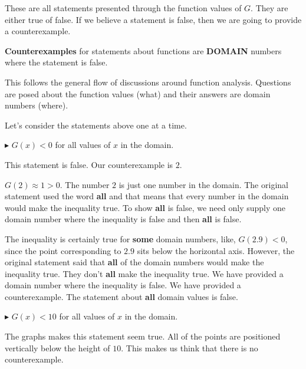 \documentclass{ximera}
\begin{document}
These are all statements presented through the function values of $G$.  They are either true of false.  If we believe a statement is false, then we are going to provide a counterexample. 

\textbf{\textcolor{red!70!black}{Counterexamples}} for statements about functions are \textbf{\textcolor{red!70!black}{DOMAIN}} numbers where the statement is false. 


This follows the general flow of discussions around function analysis.  Questions are posed about the function values (what) and their answers are domain numbers (where). 


Let's consider the statements above one at a time. 












\textbf{\textcolor{red!70!darkgray}{$\blacktriangleright$}} $G(x) < 0$  for all values of $x$ in the domain. 


This statement is false. Our counterexample is $2$.  

$G(2) \approx 1 > 0$. The number $2$ is just one number in the domain.   The original statement used the word \textbf{all} and that means that every number in the domain would make the inequality true.  To show \textbf{all} is false, we need only supply one domain number where the inequality is false and then \textbf{all} is false.

The inequality is certainly true for \textbf{some} domain numbers, like, $G(2.9) < 0$, since the point corresponding to $2.9$ sits below the horizontal axis.  However, the original statement said that \textbf{all} of the domain numbers would make the inequality true. They don't \textbf{all} make the inequality true.  We have provided a domain number where the inequality is false. We have provided a counterexample. The statement about \textbf{all} domain values is false.









\textbf{\textcolor{red!70!darkgray}{$\blacktriangleright$}} $G(x) < 10$  for all values of $x$ in the domain. 

The graphs makes this statement seem true.  All of the points are positioned vertically below the height of $10$.  This makes us think that there is no counterexample.  
\end{document}
